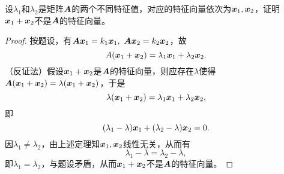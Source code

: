\begin{frame}[fragile]\ft{\subsecname}  

\begin{li}
设$\lambda_1$和$\lambda_2$是矩阵$\A$的两个不同特征值，对应的特征向量依次为$\xx_1,\xx_2$，证明$\xx_1+\xx_2$不是$\A$的特征向量。
\end{li}
\end{frame}

\begin{frame}[fragile]\ft{\subsecname}  
\begin{proof}
  按题设，有$\A\xx_1=k_1\xx_1,~\A\xx_2=k_2\xx_2$，故
  $$
  A(\xx_1+\xx_2)=\lambda_1\xx_1+\lambda_2\xx_2.
  $$
  （反证法）假设$\xx_1+\xx_2$是$\A$的特征向量，则应存在$\lambda$使得$\A(\xx_1+\xx_2)=\lambda(\xx_1+\xx_2)$，于是
  $$
  \lambda(\xx_1+\xx_2)=\lambda_1\xx_1+\lambda_2\xx_2,
  $$
  即
  $$
  (\lambda_1-\lambda)\xx_1+(\lambda_2-\lambda)\xx_2=0.
  $$
  因$\lambda_1\ne\lambda_2$，由上述定理知$\xx_1,\xx_2$线性无关，从而有
  $$
  \lambda_1-\lambda=\lambda_2-\lambda,
  $$
  即$\lambda_1=\lambda_2$，与题设矛盾，从而$\xx_1+\xx_2$不是$\A$的特征向量。
\end{proof}

\end{frame}


